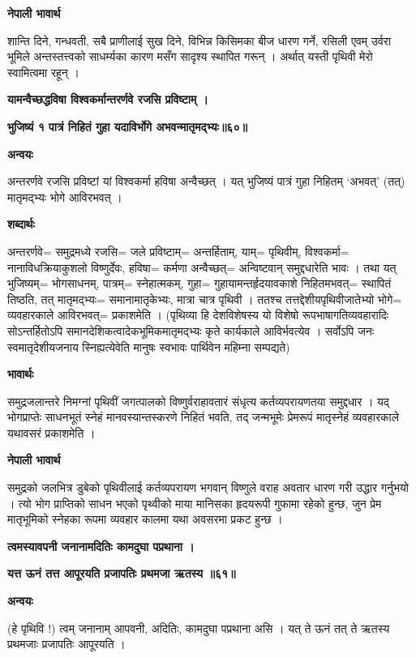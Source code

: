 \documentclass[11pt, a5paper]{article}
\begin{document}
\textbf{नेपाली भावार्थ}

शान्ति दिने, गन्धवती, सबै प्राणीलाई सुख दिने, विभिन्न किसिमका बीज धारण गर्ने, रसिली एवम् उर्वरा भूमिले अन्तस्तत्त्वको साधर्म्यका कारण मसँग सादृश्य स्थापित गरून् । अर्थात् यस्ती पृथिवी मेरो स्वामित्वमा रहून् ।

\textbf{यामन्वैच्छद्धविषा विश्वकर्मान्तरर्णवे रजसि प्रविष्टाम् ।}

\textbf{भुजिष्यं १ पात्रं निहितं गुहा यदाविर्भोगे अभवन्मातृमद्भ्यः॥६०॥}

\textbf{अन्वयः}

अन्तरर्णवे रजसि प्रविष्टां यां विश्वकर्मा हविषा अन्वैच्छत् । यत् भुजिष्यं पात्रं गुहा निहितम् ‘अभवत्’ (तत्) मातृमद्भ्यः भोगे आविरभवत् ।

\textbf{शब्दार्थः}

अन्तरर्णवे‍= समुद्रमध्ये रजसि= जले प्रविष्टाम्= अन्तर्हिताम्, याम्= पृथिवीम्, विश्वकर्मा= नानाविधक्रियाकुशलो विष्णुर्देवः, हविषा= कर्मणा अन्वैच्छत्= अन्विष्टवान् समुद्दधारेति भावः । तथा यत् भुजिष्यम्= भोगसाधनम्, पात्रम्= स्नेहात्मकम्, गुहा= गुहायामन्तर्हृदयावकाशे निहितमभवत्= स्थापितं तिष्ठति, तत् मातृमद्भ्यः= समानामातृकेभ्यः, मात्रा चात्र पृथिवी । ततश्च तत्तद्देशीयपृथिवीजातेभ्यो भोगे= व्यवहारकाले आविरभवत्= प्रकाशमेति । (पृथिव्या हि देशविशेषस्य यो विशेषो रूपभाषागतिव्यवहारादिः सोऽन्तर्हितोऽपि समानदेशिकत्वादेकभूमिकमातृमद्भ्यः कृते कार्यकाले आविर्भवत्येव । सर्वोऽपि जनः स्वमातृदेशीयजनाय स्निह्यत्येवेति मानुषः स्वभावः पार्थिवेन महिम्ना सम्पद्यते)

\textbf{भावार्थः}

समुद्रजलान्तरे निमग्नां पृथिवीं जगत्पालको विष्णुर्वराहावतारं संधृत्य कर्तव्यपरायणतया समुद्दधार । यद् भोगप्राप्तेः साधनभूतं स्नेहं मानवस्यान्तस्करणे निहितं भवति, तद् जन्मभूमेः प्रेमरूपं मातृस्नेहं व्यवहारकाले यथावसरं प्रकाशमेति ।

\textbf{नेपाली भावार्थ}

समुद्रको जलभित्र डुबेको पृथिवीलाई कर्तव्यपरायण भगवान् विष्णुले वराह अवतार धारण गरी उद्धार गर्नुभयो । त्यो भोग प्राप्तिको साधन भएको पृथ्वीको माया मानिसका हृदयरूपी गुफामा रहेको हुन्छ, जुन प्रेम मातृभूमिको स्नेहका रूपमा व्यवहार कालमा यथा अवसरमा प्रकट हुन्छ ।

\textbf{त्वमस्यावपनी जनानामदितिः कामदुघा पप्रथाना ।}

\textbf{यत्त ऊनं तत्त आपूरयति प्रजापतिः प्रथमजा ऋतस्य ॥६१॥}

\textbf{अन्वयः}

(हे पृथिवि !) त्वम् जनानाम् आपवनी, अदितिः, कामदुघा पप्रथाना असि । यत् ते ऊनं तत् ते ऋतस्य प्रथमजाः प्रजापतिः आपूरयति ।
\end{document}
